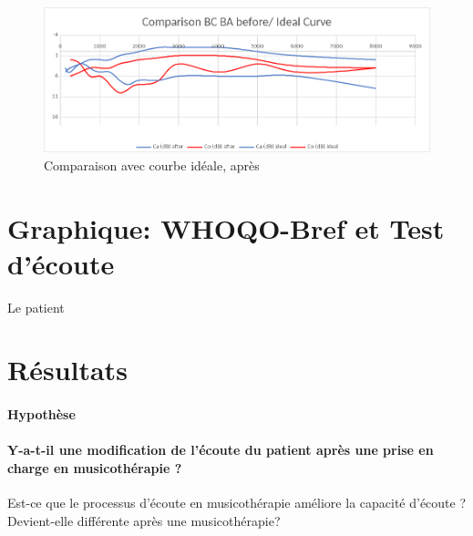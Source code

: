  \lipsum[1]
 
 \begin{figure}[bh]
 	\centering
 	\includegraphics[width=0.7\linewidth]{images/clinique/comparison_bc_ba_after_vs_ideal_curve_meyer.png}
 	\caption{Comparaison avec courbe idéale, après}
 	\label{fig:comparisonbcbaaftervsidealcurvemeyer}
 \end{figure}
 
 





      



 


\section{Graphique:  WHOQO-Bref et Test d'écoute}

Le patient 


\section{Résultats}










   
 

  

  
  


   
   
   
   







\paragraph{Hypothèse}



\paragraph{Y-a-t-il une modification de l'écoute du patient après une prise
en charge en musicothérapie ?}
Est-ce que le processus d'écoute en musicothérapie améliore la capacité
d'écoute ? Devient-elle différente après une musicothérapie?

